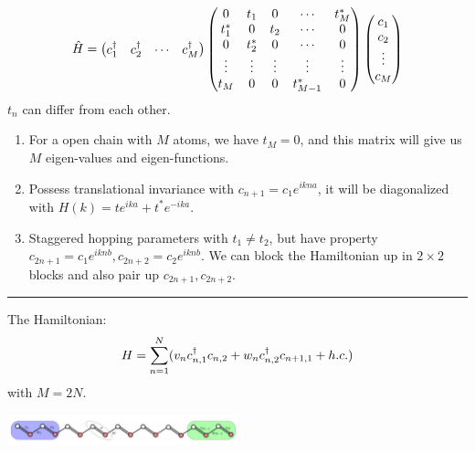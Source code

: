 \documentclass[letterpaper,10pt,english]{sphinxmanual}
\begin{document}
\begin{gather}
\begin{split}\hat{H}=\begin{pmatrix}c_1^\dagger&c_2^\dagger&\cdots&c_M^\dagger \end{pmatrix}\begin{pmatrix} 0 & t_1 &0 & \cdots&t_M^*\\
t_1^* &0&t_2&\cdots&0\\
0&t_2^*&0&\cdots&0\\
\vdots&\vdots&\vdots&\vdots&\vdots\\
t_M&0&0&t_{M-1}^*&0
\end{pmatrix}\begin{pmatrix}c_1\\c_2\\\vdots\\c_M\end{pmatrix}\end{split}\notag
\end{gather}
\(t_n\) can differ from each other.
\begin{enumerate}
\item {}
For a open chain with \(M\) atoms, we have \(t_M=0\), and
this matrix will give us \(M\) eigen-values and eigen-functions.

\item {}
Possess translational invariance with \(c_{n+1}=c_1e^{ikna}\), it
will be diagonalized with \(H(k)=te^{ika}+t^*e^{-ika}\).

\item {}
Staggered hopping parameters with \(t_1\neq t_2\), but have
property \(c_{2n+1}=c_1e^{iknb},c_{2n+2}=c_2e^{iknb}\). We can
block the Hamiltonian up in \(2\times 2\) blocks and also pair up
\(c_{2n+1},c_{2n+2}\).

\end{enumerate}


\bigskip\hrule{}\bigskip


The Hamiltonian:
\begin{gather}
\begin{split}H=\sum_{n=1}^N(v_n c_{n,1}^\dagger c_{n,2}+w_nc_{n,2}^\dagger c_{n+1,1}+h.c.)\end{split}\notag
\end{gather}
with \(M=2N\).
 
\includegraphics[width=0.5\textwidth]{2.jpg}
\end{document}
